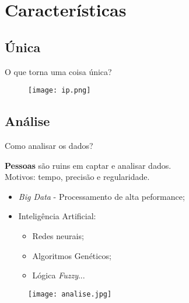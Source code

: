 \section{Características}
\label{sec:caracteristicas}

\subsection*{Única}
\begin{frame}{O que torna uma coisa única?}
	
	\begin{figure}[H]
		\texttt{[image: ip.png]}\footnotemark
	\end{figure}
	
\end{frame}

\subsection*{Análise}
\begin{frame}{Como analisar os dados?}
	\begin{block}{}
		\textbf{Pessoas} são ruins em captar e analisar dados. \\Motivos: tempo, precisão e regularidade.
	\end{block}
	
	\begin{itemize}
		\item \textit{Big Data} - Processamento de alta peformance;
		\item Inteligência Artificial: 
		\begin{itemize}
			\item Redes neurais; 
			\item Algoritmos Genéticos;
			\item Lógica \textit{Fuzzy}...
		\end{itemize}
	\end{itemize}
	
	\begin{figure}[H]
		\texttt{[image: analise.jpg]}\footnotemark
	\end{figure}
	
\end{frame}

